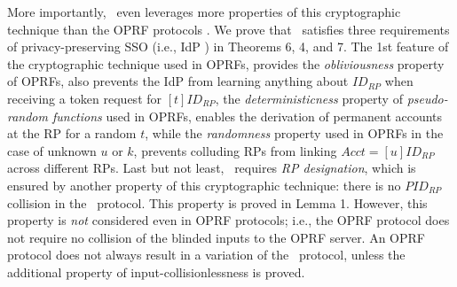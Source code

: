 More importantly, \usso\ even leverages more properties of this cryptographic technique than the OPRF protocols \cite{oprf-proved,voprf-proved,oprf-bitcoin-wallet}.
We prove that \usso\ satisfies three requirements of privacy-preserving SSO (i.e., IdP ) in
    Theorems 6, 4, and 7.
The 1st feature of the cryptographic technique used in OPRFs,
        provides the \emph{obliviousness} property of OPRFs,
    also prevents the IdP from learning anything about $ID_{RP}$ when receiving a token request for $[t]ID_{RP}$,
the \emph{deterministicness} property of \emph{pseudo-random functions} used in OPRFs,
    enables the derivation of permanent accounts at the RP for a random $t$,
while the \emph{randomness} property used in OPRFs in the case of unknown $u$ or $k$,
    prevents colluding RPs from linking $Acct = [u]ID_{RP}$ across different RPs.
Last but not least,
    \usso\ requires \emph{RP designation},
        which is ensured by another property of this cryptographic technique:
        there is no $PID_{RP}$ collision in the \usso\ protocol.
This property is proved in Lemma 1.
However, this property is \emph{not} considered even in OPRF protocols;
    i.e., the OPRF protocol \cite{oprf-proved,voprf-proved,oprf-bitcoin-wallet} does not require no collision of the blinded inputs to the OPRF server.
An OPRF protocol does not always result in a variation of the \usso\ protocol,
    unless the additional property of input-collisionlessness is proved.



